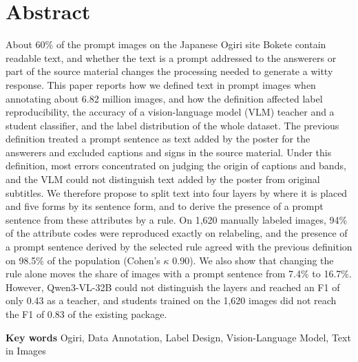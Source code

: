 \section*{Abstract}
About 60\% of the prompt images on the Japanese Ogiri site Bokete contain readable text, and whether the text is a prompt addressed to the answerers or part of the source material changes the processing needed to generate a witty response.
This paper reports how we defined text in prompt images when annotating about 6.82 million images, and how the definition affected label reproducibility, the accuracy of a vision-language model (VLM) teacher and a student classifier, and the label distribution of the whole dataset.
The previous definition treated a prompt sentence as text added by the poster for the answerers and excluded captions and signs in the source material.
Under this definition, most errors concentrated on judging the origin of captions and bands, and the VLM could not distinguish text added by the poster from original subtitles.
We therefore propose to split text into four layers by where it is placed and five forms by its sentence form, and to derive the presence of a prompt sentence from these attributes by a rule.
On 1,620 manually labeled images, 94\% of the attribute codes were reproduced exactly on relabeling, and the presence of a prompt sentence derived by the selected rule agreed with the previous definition on 98.5\% of the population (Cohen's $ \kappa $ 0.90).
We also show that changing the rule alone moves the share of images with a prompt sentence from 7.4\% to 16.7\%.
However, Qwen3-VL-32B could not distinguish the layers and reached an F1 of only 0.43 as a teacher, and students trained on the 1,620 images did not reach the F1 of 0.83 of the existing package.
\par
\noindent
{\bf Key words} Ogiri, Data Annotation, Label Design, Vision-Language Model, Text in Images
